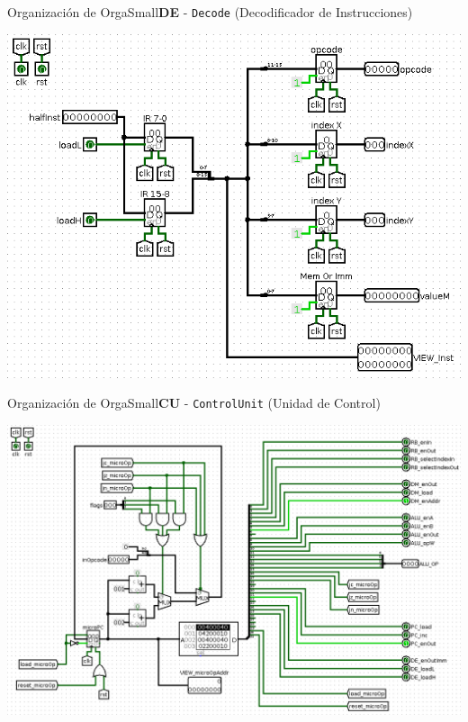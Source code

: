 \documentclass[aspectratio=169]{beamer}
\begin{document}
\begin{frame}[fragile,t]{Organización de OrgaSmall}{\textbf{DE} - \texttt{Decode} (Decodificador de Instrucciones)}
    \begin{center} \includegraphics[scale=0.3]{img/6_Decode.png} \end{center}
\end{frame}

\begin{frame}[fragile,t]{Organización de OrgaSmall}{\textbf{CU} - \texttt{ControlUnit} (Unidad de Control)}
    \begin{center} \includegraphics[scale=0.27]{img/7_ControlUnit.png} \end{center}
\end{frame}
\end{document}
